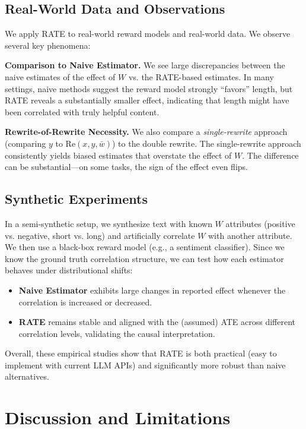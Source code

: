 \subsection{Real-World Data and Observations}

We apply RATE to real-world reward models and real-world data. We observe several key phenomena:

\textbf{Comparison to Naive Estimator.} We see large discrepancies between the naive estimates of the effect of $W$ vs. the RATE-based estimates. In many settings, naive methods suggest the reward model strongly ``favors'' length, but RATE reveals a substantially smaller effect, indicating that length might have been correlated with truly helpful content.

\textbf{Rewrite-of-Rewrite Necessity.} We also compare a \emph{single-rewrite} approach (comparing $y$ to $\text{Re}(x, y, \bar{w})$) to the double rewrite. The single-rewrite approach consistently yields biased estimates that overstate the effect of $W$. The difference can be substantial---on some tasks, the sign of the effect even flips.

\subsection{Synthetic Experiments}

In a semi-synthetic setup, we synthesize text with known $W$ attributes (positive vs. negative, short vs. long) and artificially correlate $W$ with another attribute. We then use a black-box reward model (e.g., a sentiment classifier). Since we know the ground truth correlation structure, we can test how each estimator behaves under distributional shifts:
\begin{itemize}
    \item \textbf{Naive Estimator} exhibits large changes in reported effect whenever the correlation is increased or decreased.
    \item \textbf{RATE} remains stable and aligned with the (assumed) ATE across different correlation levels, validating the causal interpretation.
\end{itemize}

Overall, these empirical studies show that RATE is both practical (easy to implement with current LLM APIs) and significantly more robust than naive alternatives.

\section{Discussion and Limitations}
\label{sec:discussion}

